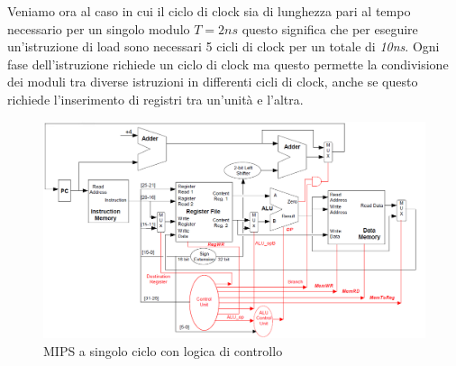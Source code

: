 Veniamo ora al caso in cui il ciclo di clock sia di lunghezza pari al tempo necessario per un singolo modulo $T = 2 ns$ questo significa che per eseguire un'istruzione di load sono necessari 5 cicli di clock per un totale di \emph{10ns}. Ogni fase dell'istruzione richiede un ciclo di clock ma questo permette la condivisione dei moduli tra diverse istruzioni in differenti cicli di clock, anche se questo richiede l'inserimento di registri tra un'unità  e l'altra.
\begin{figure}[!Hptb]
\centering
\includegraphics[scale=0.67, angle=90]{img/monocic.png}
\caption{MIPS a singolo ciclo con logica di controllo}\label{fig:monocic}
\end{figure}
